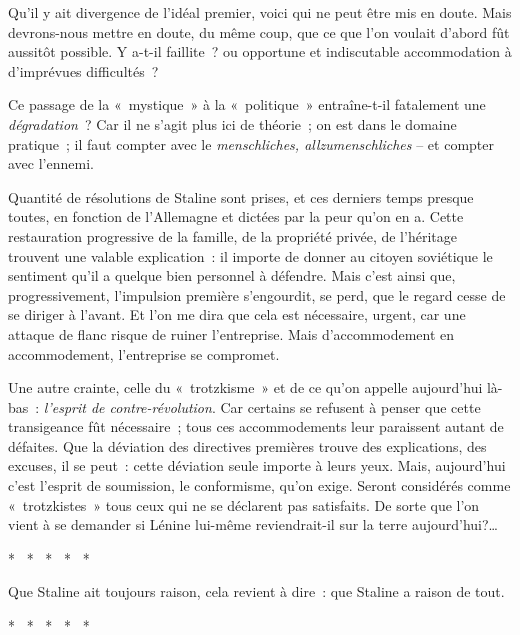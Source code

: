 \documentclass[french,twoside]{book} %
\begin{document}
\noindent Qu’il y ait divergence de l’idéal premier, voici qui ne peut être mis en doute. Mais devrons-nous mettre en doute, du même coup, que ce que l’on voulait d’abord fût aussitôt possible. Y a-t-il faillite ? ou opportune et indiscutable accommodation à d’imprévues difficultés ?\par
Ce passage de la « mystique » à la « politique » entraîne-t-il fatalement une \emph{dégradation} ? Car il ne s’agit plus ici de théorie ; on est dans le domaine pratique ; il faut compter avec le \emph{menschliches, allzumenschliches} – et compter avec l’ennemi.\par
Quantité de résolutions de Staline sont prises, et ces derniers temps presque toutes, en fonction de l’Allemagne et dictées par la peur qu’on en a. Cette restauration progressive de la famille, de la propriété privée, de l’héritage trouvent une valable explication : il importe de donner au citoyen soviétique le sentiment qu’il a quelque bien personnel à défendre. Mais c’est ainsi que, progressivement, l’impulsion première s’engourdit, se perd, que le regard cesse de se diriger à l’avant. Et l’on me dira que cela est nécessaire, urgent, car une attaque de flanc risque de ruiner l’entreprise. Mais d’accommodement en accommodement, l’entreprise se compromet.\par
Une autre crainte, celle du « trotzkisme » et de ce qu’on appelle aujourd’hui là-bas : \emph{l’esprit de contre-révolution}. Car certains se refusent à penser que cette transigeance fût nécessaire ; tous ces accommodements leur paraissent autant de défaites. Que la déviation des directives premières trouve des explications, des excuses, il se peut : cette déviation seule importe à leurs yeux. Mais, aujourd’hui c’est l’esprit de soumission, le conformisme, qu’on exige. Seront considérés comme « trotzkistes » tous ceux qui ne se déclarent pas satisfaits. De sorte que l’on vient à se demander si Lénine lui-même reviendrait-il sur la terre aujourd’hui?…\par

\begin{center}
\noindent \centerline{*  *  *  *  *}\par
\end{center}

\noindent Que Staline ait toujours raison, cela revient à dire : que Staline a raison de tout.\par

\begin{center}
\noindent \centerline{*  *  *  *  *}\par
\end{center}
\end{document}
